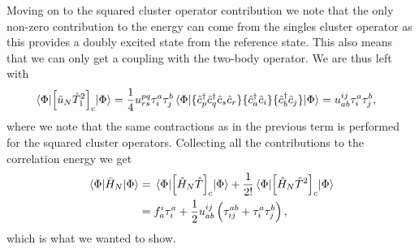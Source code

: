         Moving on to the squared cluster operator contribution we note that the
        only non-zero contribution to the energy can come from the singles
        cluster operator as this provides a doubly excited state from the
        reference state.
        This also means that we can only get a coupling with the two-body
        operator.
        We are thus left with
        \begin{align}
            \mel{\Phi}{
                \left[ 
                    \hat{u}_N \hat{T}_1^2
                 \right]_c
            }{\Phi}
            &=
            \frac{1}{4}u^{pq}_{rs}\tau^{a}_{i}\tau^{b}_{j}
            \mel{\Phi}{
                \{ 
                    \hat{c}_{p}^{\dagger}
                    \hat{c}_{q}^{\dagger}
                    \hat{c}_{s}
                    \hat{c}_{r}
                 \}
                \{ 
                    \hat{c}_{a}^{\dagger}
                    \hat{c}_{i}
                 \}
                \{ 
                    \hat{c}_{b}^{\dagger}
                    \hat{c}_{j}
                 \}
            }{\Phi}
            =
            u^{ij}_{ab}\tau^{a}_{i}\tau^{b}_{j},
        \end{align}
        where we note that the same contractions as in the previous term is
        performed for the squared cluster operators.
        Collecting all the contributions to the correlation energy we get
        \begin{align}
            \mel{\Phi}{\bar{H}_N}{\Phi}
            &=
            \mel{\Phi}{
                \left[ 
                    \hat{H}_N\hat{T}\right]_{c}
            }{\Phi}
            + \frac{1}{2!}
            \mel{\Phi}{
                \left[ 
                    \hat{H}_N\hat{T}^2
                 \right]_{c}
            }{\Phi}
            \\
            &=
            f^{i}_{a}\tau^{a}_{i}
            + \frac{1}{2} u^{ij}_{ab}\left( 
                \tau^{ab}_{ij}
                + \tau^{a}_{i}\tau^{b}_{j}
             \right),
        \end{align}
        which is what we wanted to show.

